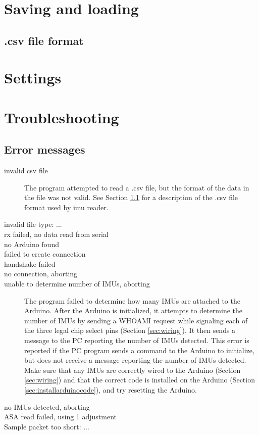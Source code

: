 \documentclass[11pt,letterpaper,article]{memoir}
\newcommand{\name}{imu reader}
\begin{document}
\section{Saving and loading}
\subsection{.csv file format}
\label{sec:savingloading}

\section{Settings}

\section{Troubleshooting}

\subsection{Error messages}

\begin{description}
\item[invalid csv file] The program attempted to read a .csv file, but the
format of the data in the file was not valid. See Section
\ref{sec:savingloading} for a description of the .csv file format used by
\name{}.

\item[invalid file type: ...]
\item[rx failed, no data read from serial]
\item[no Arduino found]
\item[failed to create connection]
\item[handshake failed]
\item[no connection, aborting]

\item[unable to determine number of IMUs, aborting] The program failed to
determine how many IMUs are attached to the Arduino. After the Arduino is
initialized, it attempts to determine the number of IMUs by sending a WHOAMI
request while signaling each of the three legal chip select pins (Section
\ref{sec:wiring}). It then sends a message to the PC reporting the number of
IMUs detected. This error is reported if the PC program sends a command to the
Arduino to initialize, but does not receive a message reporting the number of
IMUs detected. Make sure that any IMUs are correctly wired to the Arduino
(Section \ref{sec:wiring}) and that the correct code is installed on the Arduino
(Section \ref{sec:installarduinocode}), and try resetting the Arduino.

\item[no IMUs detected, aborting]

\item[ASA read failed, using 1 adjustment]

\item[Sample packet too short: ...]


\end{description}







%
%
\end{document}
